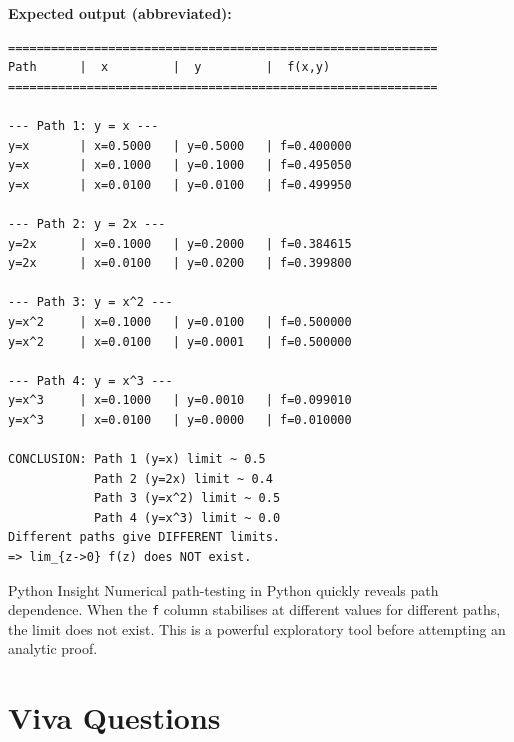 \documentclass[12pt,a4paper]{article}
\begin{document}
\textbf{Expected output (abbreviated):}
\begin{verbatim}
============================================================
Path      |  x         |  y         |  f(x,y)
============================================================

--- Path 1: y = x ---
y=x       | x=0.5000   | y=0.5000   | f=0.400000
y=x       | x=0.1000   | y=0.1000   | f=0.495050
y=x       | x=0.0100   | y=0.0100   | f=0.499950

--- Path 2: y = 2x ---
y=2x      | x=0.1000   | y=0.2000   | f=0.384615
y=2x      | x=0.0100   | y=0.0200   | f=0.399800

--- Path 3: y = x^2 ---
y=x^2     | x=0.1000   | y=0.0100   | f=0.500000
y=x^2     | x=0.0100   | y=0.0001   | f=0.500000

--- Path 4: y = x^3 ---
y=x^3     | x=0.1000   | y=0.0010   | f=0.099010
y=x^3     | x=0.0100   | y=0.0000   | f=0.010000

CONCLUSION: Path 1 (y=x) limit ~ 0.5
            Path 2 (y=2x) limit ~ 0.4
            Path 3 (y=x^2) limit ~ 0.5
            Path 4 (y=x^3) limit ~ 0.0
Different paths give DIFFERENT limits.
=> lim_{z->0} f(z) does NOT exist.
\end{verbatim}

\begin{learnbox}{Python Insight}
Numerical path-testing in Python quickly reveals path dependence.
When the \texttt{f} column stabilises at different values for different paths,
the limit does not exist.  This is a powerful exploratory tool before
attempting an analytic proof.
\end{learnbox}

\section{Viva Questions}
\end{document}
